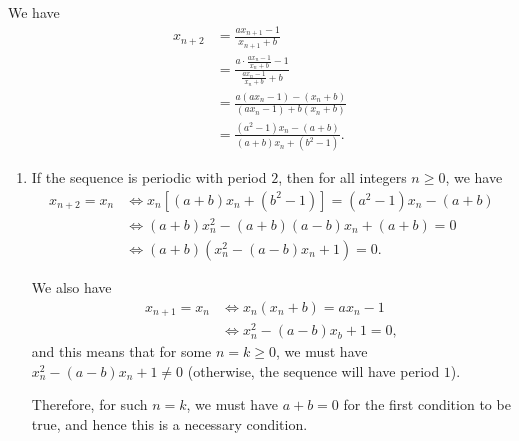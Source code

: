 \Question{\currfilebase}

We have
\begin{align*}
    x_{n + 2} & = \frac{a x_{n + 1} - 1}{x_{n + 1} + b}                                       \\
              & = \frac{a \cdot \frac{a x_n - 1}{x_n + b} - 1}{\frac{a x_n - 1}{x_n + b} + b} \\
              & = \frac{a (a x_n - 1) - (x_n + b)}{(a x_n - 1) + b (x_n + b)}                 \\
              & = \frac{(a^2 - 1) x_n - (a + b)}{(a + b) x_n + (b^2 - 1)}.
\end{align*}

\begin{enumerate}
    \item If the sequence is periodic with period \(2\), then for all integers \(n \geq 0\), we have
          \begin{align*}
              x_{n + 2} = x_n & \iff x_n \left[(a + b) x_n + (b^2 - 1)\right] = (a^2 - 1) x_n - (a + b) \\
                              & \iff (a + b) x_n^2 - (a + b) (a - b) x_n + (a + b) = 0                  \\
                              & \iff (a + b) (x_n^2 - (a - b) x_n + 1) = 0.
          \end{align*}

          We also have
          \begin{align*}
              x_{n + 1} = x_n & \iff x_n (x_n + b) = a x_n - 1    \\
                              & \iff x_n^2 - (a - b) x_b + 1 = 0,
          \end{align*}
          and this means that for some \(n = k \geq 0\), we must have \(x_n^2 - (a - b) x_n + 1 \neq 0\) (otherwise, the sequence will have period \(1\)).

          Therefore, for such \(n = k\), we must have \(a + b = 0\) for the first condition to be true, and hence this is a necessary condition.


\end{enumerate}
